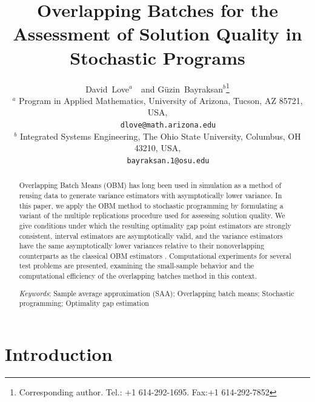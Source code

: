 \documentclass[12pt]{article}
\newcommand{\Keywords}[1]{\par\noindent 
{\small{\em Keywords\/}: #1}}
\begin{document}
\title{Overlapping Batches for the Assessment of Solution Quality in Stochastic Programs}

\author{David~Love$^{a}$\ \ and G\"{u}zin~Bayraksan$^{b}$\thanks{Corresponding author. Tel.: +1 614-292-1695. Fax:+1 614-292-7852}\\[6pt]
{\small
      $^{a}$ Program in Applied Mathematics, University of Arizona, Tucson, AZ 85721, USA,}\\
{\small \ \ \ \ \ \texttt{dlove@math.arizona.edu}} \\
{\small 
      $^{b}$ Integrated Systems Engineering, The Ohio State University, Columbus, OH 43210, USA,}\\
{\small \ \ \ \  \   \texttt{bayraksan.1@osu.edu}}}
\date{}

\maketitle

\begin{abstract}
\noindent Overlapping Batch Means (OBM) has long been used in simulation as a method of reusing data to generate variance estimators with asymptotically lower variance.
In this paper, we apply the OBM method to stochastic programming by formulating a variant of the multiple replications procedure used for assessing solution quality.
We give conditions under which the resulting optimality gap point estimators are strongly consistent, interval estimators are asymptotically valid, and the variance estimators have the same asymptotically lower variances relative to their nonoverlapping counterparts as the classical OBM estimators \citep{Meketon1984,Welch1987}.
Computational experiments for several test problems are presented, examining the small-sample behavior and the computational efficiency of the overlapping batches method in this context.\medskip

\Keywords{Sample average approximation (SAA); Overlapping batch means;   Stochastic programming; Optimality gap estimation}
\end{abstract}

\section{Introduction}
\label{sec:intro}
\end{document}
